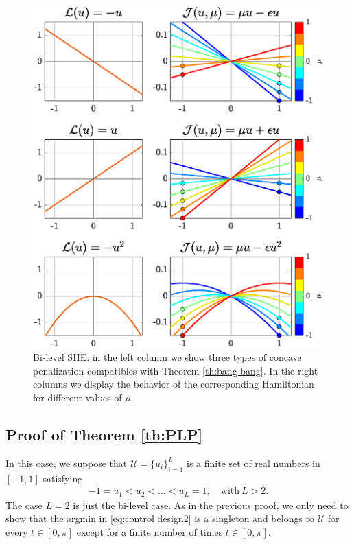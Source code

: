 \documentclass[twocolumn]{autart}    %
\begin{document}
\begin{figure}[h] 
	\centering
	\includegraphics[scale=0.415]{img/fig03.eps}
	\caption{Bi-level SHE: in the left column we show three types of concave penalization compatibles with Theorem \ref{th:bang-bang}. In the right columns we display the behavior of the corresponding Hamiltonian for different values of $\mu$.}\label{fig:Bang-Bang-penalization} 
\end{figure}
  
\subsection{Proof of Theorem \ref{th:PLP}}\label{proof:PLP}

In this case, we suppose that $\mathcal{U} = \{ u_i\}_{i=1}^L$ is a finite set of real numbers in $[-1,1]$ satisfying
\begin{align*} 
	-1 = u_1 < u_2 <\ldots <u_L = 1, \quad \text{with} \ L> 2.
\end{align*} 
The case $L=2$ is just the bi-level case. As in the previous proof, we only need to show that the argmin in \eqref{eq:control design2} is a singleton and belongs to $\mathcal{U}$ for every $t\in [0,\pi]$ except for a finite number of times $t\in [0,\pi]$.
\end{document}
